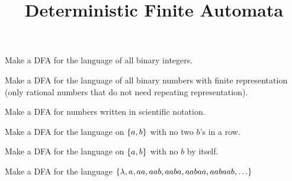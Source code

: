 \documentclass{article}
\title{Deterministic Finite Automata}
\begin{document}
	\maketitle

	 Make a DFA for the language of all binary integers.
	
	\bigskip
	\bigskip
	\bigskip
	\bigskip
	\bigskip
	\bigskip
	
	 Make a DFA for the language of all binary numbers with finite representation (only rational numbers that do not need repeating representation).
	\bigskip
	\bigskip
	\bigskip
	\bigskip
	\bigskip
	\bigskip
	
	 Make a DFA for numbers written in scientific notation.
	\bigskip
	\bigskip
	\bigskip
	\bigskip
	\bigskip
	\bigskip
	
	 Make a DFA for the language on $\left\{ {a,b} \right\}$ with no two $b$'s in a row.
	\bigskip
	\bigskip
	\bigskip
	\bigskip
	\bigskip
	\bigskip
	
	 Make a DFA for the language on $\left\{ {a,b} \right\}$ with no $b$ by itself.
	\bigskip
	\bigskip
	\bigskip
	\bigskip
	\bigskip
	\bigskip
	
	 Make a DFA for the language $\left\{ {\lambda, a, aa, aab, aaba, aabaa, aabaab, \ldots} \right\}$
\end{document}
